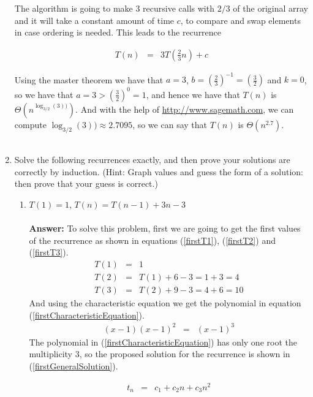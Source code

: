 \documentclass[12pt]{scrartcl}
\begin{document}
\begin{enumerate}
The algorithm is going to make 3 recursive calls with $2/3$ of the original array and it will take a constant amount of time $c$, to compare and swap elements in case ordering is needed. This leads to the recurrence

\begin{eqnarray}
	T(n)  &	=	&	3T\left(\frac{2}{3} n\right) + c
\end{eqnarray}

Using the master theorem we have that $a = 3$, $b = \left(\frac{2}{3}\right)^{-1} = \left(\frac{3}{2}\right)$ and $k = 0$, so we have that $a = 3 > \left(\frac{3}{2}\right)^0 = 1$, and hence we have that $T(n)$ is $\Theta(n^{\log_{3/2}(3))})$. And with the help of \url{http://www.sagemath.com}, we can compute $\log_{3/2}(3)) \approx 2.7095$, so we can say that $T(n)$ is $\Theta(n^{2.7})$.\\
\\



	
	\item Solve the following recurrences exactly, and then prove your solutions are correctly by induction. (Hint: Graph values and guess the form of a solution: then prove that your guess is correct.)
		\begin{enumerate}
			\item $T(1) = 1$, $T(n) = T(n - 1) + 3n -3$\\
			\\
			\textbf{Answer:} To solve this problem, first we are going to get the first values of the recurrence as shown in equations (\ref{firstT1}), (\ref{firstT2}) and (\ref{firstT3}).
			\begin{eqnarray}
			T(1)	&	=	&	1 \label{firstT1}\\
			T(2)	&	=	&	T(1) + 6 - 3 = 1 + 3 = 4 \label{firstT2}\\
			T(3)	&	=	&	T(2) + 9 - 3 = 4 + 6 = 10\label{firstT3}
			\end{eqnarray}
			And using the characteristic equation we get the polynomial in equation (\ref{firstCharacteristicEquation}).
			\begin{eqnarray}\label{firstCharacteristicEquation}
				(x - 1)(x - 1)^2 	&	=	& (x - 1)^3
			\end{eqnarray}
			The polynomial in (\ref{firstCharacteristicEquation}) has only one root the multiplicity 3, so the proposed solution for the recurrence is shown in (\ref{firstGeneralSolution}).
			
			\begin{eqnarray}\label{firstGeneralSolution}
			t_n 	&	=	&	c_1 + c_2n + c_3 n^2
			\end{eqnarray}
			

\end{enumerate}
\end{enumerate}
\end{document}
